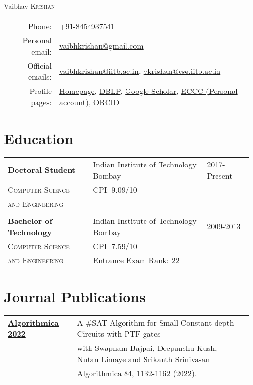 \documentclass[a4paper,10pt]{article}
\begin{document}
\par{\centering
{\Huge Vaibhav \textsc{Krishan}
}\bigskip\par}

\begin{tabular}{rl}
  Phone: & +91-8454937541 \\
  Personal email: & \href{mailto:vaibhkrishan@gmail.com}{vaibhkrishan@gmail.com} \\ 
  Official emails: & \href{mailto:vaibhkrishan@iitb.ac.in}{vaibhkrishan@iitb.ac.in}, \href{mailto:vkrishan@cse.iitb.ac.in}{vkrishan@cse.iitb.ac.in} \\
  Profile pages: & \href{https://vaibhkrishan.github.io}{Homepage}, 
  \href{https://dblp.org/pid/187/8296.html}{DBLP},
  \href{https://scholar.google.com/citations?user=dVMC44EAAAAJ&hl=en}{Google Scholar},
  \href{https://eccc.weizmann.ac.il/author/1412/">ECCC (IIT Bombay account)</a>, <a href="https://eccc.weizmann.ac.il/author/985/}{ECCC (Personal account)},
  \href{https://orcid.org/0009-0000-0335-1963}{ORCID}
\end{tabular}

\section{Education}

\begin{tabular}{lll}
  {\bf Doctoral Student} & Indian Institute of Technology Bombay & 2017-Present \\
  \textsc{Computer Science} & CPI: 9.09/10 & \\
  \textsc{and Engineering} \\
  \\
  {\bf Bachelor of Technology} & Indian Institute of Technology Bombay & 2009-2013 \\
  \textsc{Computer Science} & CPI: 7.59/10 & \\
  \textsc{and Engineering} & Entrance Exam Rank: 22 & \\
\end{tabular}

\section{Journal Publications}

\begin{tabular}{p{2.5cm}|p{11cm}l}
  \href{https://link.springer.com/article/10.1007/s00453-021-00915-7}{{\bf Algorithmica 2022}} & A \#SAT Algorithm for Small Constant-depth Circuits with PTF gates \\
  & with Swapnam Bajpai, Deepanshu Kush, Nutan Limaye and Srikanth Srinivasan \\
  & Algorithmica 84, 1132-1162 (2022).
\end{tabular}
\end{document}
